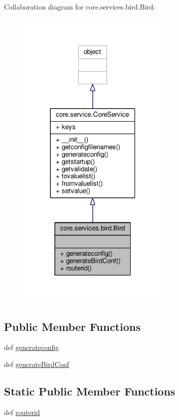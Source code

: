 Collaboration diagram for core.\+services.\+bird.\+Bird\+:
\nopagebreak
\begin{figure}[H]
\begin{center}
\leavevmode
\includegraphics[width=207pt]{classcore_1_1services_1_1bird_1_1_bird__coll__graph}
\end{center}
\end{figure}
\subsection*{Public Member Functions}
\begin{DoxyCompactItemize}
\item 
def \hyperlink{classcore_1_1services_1_1bird_1_1_bird_a616b0a597c736f30a3e5e3428c8c214c}{generateconfig}
\item 
def \hyperlink{classcore_1_1services_1_1bird_1_1_bird_a3b3dcd09d93a0c55dc1402b0a8cd5c2f}{generate\+Bird\+Conf}
\end{DoxyCompactItemize}
\subsection*{Static Public Member Functions}
\begin{DoxyCompactItemize}
\item 
def \hyperlink{classcore_1_1services_1_1bird_1_1_bird_a7b79dbcd32714b3e99711bf4a7113328}{routerid}
\end{DoxyCompactItemize}
